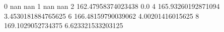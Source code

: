 0 nan nan
1 nan nan
2 162.47958374023438 0.0
4 165.93260192871094 3.4530181884765625
6 166.48159790039062 4.00201416015625
8 169.1029052734375 6.623321533203125
